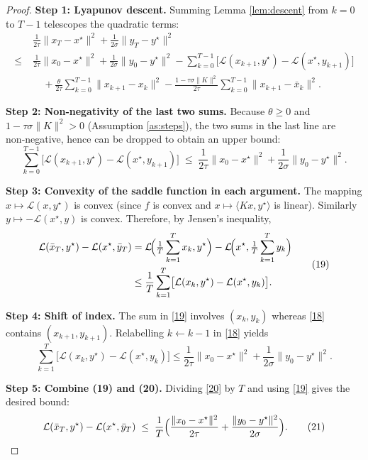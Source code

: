 \documentclass{article}
\begin{document}
\begin{proof}
\textbf{Step 1: Lyapunov descent.}  
Summing Lemma \ref{lem:descent} from $k=0$ to $T-1$ telescopes the quadratic terms:
\[
\begin{aligned}
&\frac{1}{2\tau}\|x_{T}-x^{\star}\|^{2}
+\frac{1}{2\sigma}\|y_{T}-y^{\star}\|^{2}
\\
\le\;&
\frac{1}{2\tau}\|x_{0}-x^{\star}\|^{2}
+\frac{1}{2\sigma}\|y_{0}-y^{\star}\|^{2}
-\sum_{k=0}^{T-1}\bigl[\mathcal{L}(x_{k+1},y^{\star})-\mathcal{L}(x^{\star},y_{k+1})\bigr] \\
&\quad
+\frac{\theta}{2\tau}\sum_{k=0}^{T-1}\|x_{k+1}-x_{k}\|^{2}
-\frac{1-\tau\sigma\|K\|^{2}}{2\tau}\sum_{k=0}^{T-1}\|x_{k+1}-\bar x_{k}\|^{2}.
\end{aligned}
\tag{17}
\]

\textbf{Step 2: Non‑negativity of the last two sums.}  
Because $\theta\ge0$ and $1-\tau\sigma\|K\|^{2}>0$ (Assumption \ref{as:steps}), the two sums in the last line are non‑negative, hence can be dropped to obtain an upper bound:
\[
\sum_{k=0}^{T-1}\bigl[\mathcal{L}(x_{k+1},y^{\star})-\mathcal{L}(x^{\star},y_{k+1})\bigr]
\;\le\;
\frac{1}{2\tau}\|x_{0}-x^{\star}\|^{2}
+\frac{1}{2\sigma}\|y_{0}-y^{\star}\|^{2}.
\tag{18}
\]

\textbf{Step 3: Convexity of the saddle function in each argument.}  
The mapping $x\mapsto \mathcal{L}(x,y^{\star})$ is convex (since $f$ is convex and $x\mapsto \langle Kx,y^{\star}\rangle$ is linear). Similarly $y\mapsto -\mathcal{L}(x^{\star},y)$ is convex. Therefore, by Jensen’s inequality,
\[
\begin{aligned}
\mathcal{L}(\bar x_{T},y^{\star})
-\mathcal{L}(x^{\star},\bar y_{T})
&=
\mathcal{L}\!\Bigl(\tfrac1T\sum_{k=1}^{T}x_{k},y^{\star}\Bigr)
-\mathcal{L}\!\Bigl(x^{\star},\tfrac1T\sum_{k=1}^{T}y_{k}\Bigr)\\
&\le \frac1T\sum_{k=1}^{T}\bigl[\mathcal{L}(x_{k},y^{\star})-\mathcal{L}(x^{\star},y_{k})\bigr].
\end{aligned}
\tag{19}
\]

\textbf{Step 4: Shift of index.}  
The sum in \eqref{19} involves $(x_{k},y_{k})$ whereas \eqref{18} contains $(x_{k+1},y_{k+1})$. Relabelling $k\leftarrow k-1$ in \eqref{18} yields
\[
\sum_{k=1}^{T}\bigl[\mathcal{L}(x_{k},y^{\star})-\mathcal{L}(x^{\star},y_{k})\bigr]
\le
\frac{1}{2\tau}\|x_{0}-x^{\star}\|^{2}
+\frac{1}{2\sigma}\|y_{0}-y^{\star}\|^{2}.
\tag{20}
\]

\textbf{Step 5: Combine (19) and (20).}  
Dividing \eqref{20} by $T$ and using \eqref{19} gives the desired bound:
\[
\mathcal{L}(\bar x_{T},y^{\star})-\mathcal{L}(x^{\star},\bar y_{T})
\;\le\;
\frac{1}{T}\Bigl(\frac{\|x_{0}-x^{\star}\|^{2}}{2\tau}
+\frac{\|y_{0}-y^{\star}\|^{2}}{2\sigma}\Bigr).
\tag{21}
\]


\end{proof}
\end{document}
